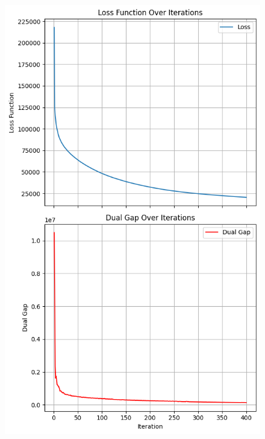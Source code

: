 \documentclass[12pt]{beamer}
\begin{document}
\begin{frame}
\begin{figure}[H]
        \includegraphics[height=0.75\textheight]{image/movielens_loss_gap_line_search.png}
        \hspace{-0.2cm}

\end{figure}
\end{frame}
\end{document}
